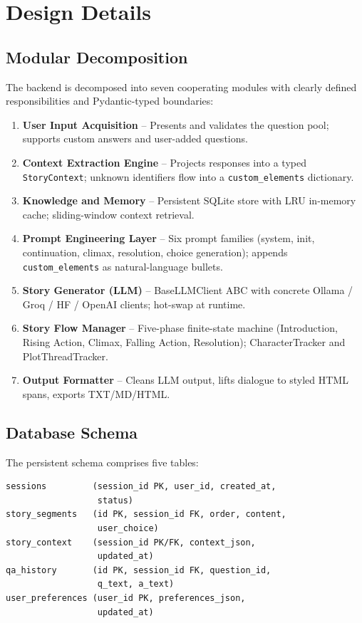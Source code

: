 \section{Design Details}
\label{sec:design}

\subsection{Modular Decomposition}
The backend is decomposed into seven cooperating modules with clearly
defined responsibilities and Pydantic-typed boundaries:

\begin{enumerate}
    \item \textbf{User Input Acquisition} -- Presents and validates
    the question pool; supports custom answers and user-added
    questions.
    \item \textbf{Context Extraction Engine} -- Projects responses
    into a typed \texttt{StoryContext}; unknown identifiers flow into
    a \texttt{custom\_elements} dictionary.
    \item \textbf{Knowledge and Memory} -- Persistent SQLite store
    with LRU in-memory cache; sliding-window context retrieval.
    \item \textbf{Prompt Engineering Layer} -- Six prompt families
    (system, init, continuation, climax, resolution, choice
    generation); appends \texttt{custom\_elements} as natural-language
    bullets.
    \item \textbf{Story Generator (LLM)} -- BaseLLMClient ABC with
    concrete Ollama / Groq / HF / OpenAI clients; hot-swap at runtime.
    \item \textbf{Story Flow Manager} -- Five-phase finite-state
    machine (Introduction, Rising Action, Climax, Falling Action,
    Resolution); CharacterTracker and PlotThreadTracker.
    \item \textbf{Output Formatter} -- Cleans LLM output, lifts
    dialogue to styled HTML spans, exports TXT/MD/HTML.
\end{enumerate}

\subsection{Database Schema}
The persistent schema comprises five tables:

\begin{lstlisting}
sessions         (session_id PK, user_id, created_at,
                  status)
story_segments   (id PK, session_id FK, order, content,
                  user_choice)
story_context    (session_id PK/FK, context_json,
                  updated_at)
qa_history       (id PK, session_id FK, question_id,
                  q_text, a_text)
user_preferences (user_id PK, preferences_json,
                  updated_at)
\end{lstlisting}

